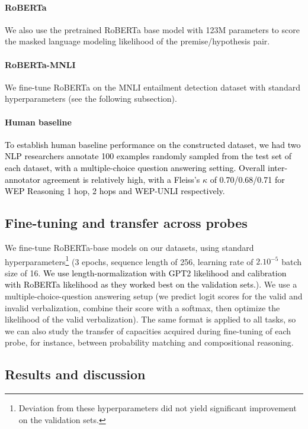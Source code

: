 \documentclass[11pt]{article}
\def \thecolor {black}
\newcommand{\blue}[1]{\textcolor{\thecolor}{#1}}
\begin{document}
\paragraph{RoBERTa} We also use the pretrained RoBERTa base model with 123M parameters  \cite{liu2019roberta} to score the masked language modeling likelihood of the premise/hypothesis pair.
\vspace{-1mm}
\paragraph{RoBERTa-MNLI} We fine-tune RoBERTa on the MNLI entailment detection dataset \citep{williamsmnli18} with standard hyperparameters (see the following subsection).
\vspace{-1mm}
\paragraph{Human baseline} \blue{To establish human baseline performance on the constructed dataset, we had two NLP researchers annotate 100 examples randomly sampled from the test set of each dataset, with a multiple-choice question answering setting. Overall inter-annotator agreement is relatively high, with a Fleiss’s $\kappa$ of 0.70/0.68/0.71 for WEP Reasoning 1 hop, 2 hops and WEP-UNLI respectively.
}

\subsection{Fine-tuning and transfer across probes}

We fine-tune RoBERTa-base models on our datasets, using standard \citep{mosbach2021on} hyperparameters\footnote{Deviation from these hyperparameters did not yield significant improvement on the validation sets.} (3 epochs, sequence length of 256, learning rate of $2.10^{-5}$ batch size of 16. \blue{We use length-normalization with GPT2 likelihood and calibration with RoBERTa likelihood as they worked best on the validation sets.}).
We use a multiple-choice-question answering setup (we predict logit scores for the valid and invalid verbalization, combine their score with a softmax, then optimize the likelihood of the valid verbalization). The same format is applied to all tasks, so we can also study the transfer of capacities acquired during fine-tuning of each probe, for instance, between probability matching and compositional reasoning.



\subsection{Results and discussion}
\end{document}
